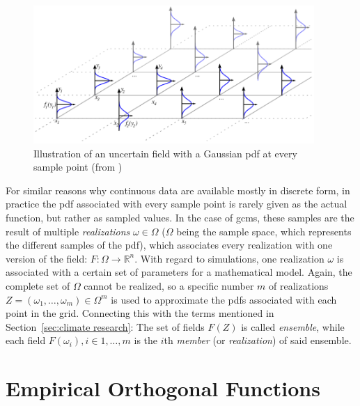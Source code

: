 \begin{figure}[htb]
  \begin{center}
    \includegraphics[width=0.95\textwidth]{figures/uncertain_gaussian_field.png}
  \end{center}
  \caption[Uncertain Field Illustration]{Illustration of an uncertain field with a Gaussian \ac{pdf} at every sample point (from \cite{pothkow2015modeling})}
  \label{fig:uncertain field example}
\end{figure}

For similar reasons why continuous data are available mostly in discrete form, in practice the \ac{pdf} associated with every sample point is rarely given as the actual function, but rather as sampled values. 
In the case of \acp{gcm}, these samples are the result of multiple \textit{realizations} $\omega \in \Omega$ ($\Omega$ being the sample space, which represents the different samples of the \ac{pdf}), which associates every realization with one version of the field: $F: \Omega \rightarrow \mathbb{R}^n$.
With regard to simulations, one realization $\omega$ is associated with a certain set of parameters for a mathematical model. 
Again, the complete set of $\Omega$ cannot be realized, so a specific number $m$ of realizations $Z = (\omega_1,\dots,\omega_m) \in \Omega^m$ is used to approximate the \acp{pdf} associated with each point in the grid. 
Connecting this with the terms mentioned in Section~\ref{sec:climate research}: The set of fields $F(Z)$ is called \textit{ensemble}, while each field $F(\omega_i), i \in {1,\dots,m}$ is the $i$th \textit{member} (or \textit{realization}) of said ensemble. \cite{vietinghoffdiss}  


\section{Empirical Orthogonal Functions}
\label{sec:eof}


